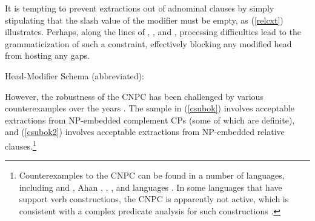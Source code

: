 \documentclass[output=paper
 	        ,biblatex
                ,babelshorthands
                ,newtxmath
                ,draftmode
                ,colorlinks, citecolor=brown
]{langscibook}
\begin{document}
\eal \label{cpnpb}
\zl

\eal  \label{cpnpb2}
\zl 

\noindent
It is tempting to prevent extractions out of adnominal clauses by simply stipulating that the {\sc
  slash} value of the modifier must be empty, as (\ref{relcxt}) illustrates.  Perhaps, along the
lines of \citet{fodor78,Fodor83}, \citet{berwickwein}, and \citet{hawkins,hawbook}, processing
difficulties lead to the grammaticization of such a constraint, effectively blocking any modified
head from hosting any gaps.

\vbox{
\ea \label{relcxt}
Head-Modifier Schema (abbreviated):\\
\z 
}

However, the robustness of the CNPC has been challenged by various counterexamples over the years
\parencites[139]{Ross67}[--207]{pollardsag}{kluender}[]{postal98}{saghof}.
The sample in (\ref{csubok}) involves acceptable extractions from NP-embedded complement CPs (some of which are definite), and
(\ref{csubok2}) involves acceptable extractions from NP-embedded relative
clauses.\footnote{Counterexamples to the CNPC can be found in a number of languages, including
   and  \citep{kunojap,Nishigauchi99}, Ahan \citep{saah}, 
  \citep[Chapter 2]{shir},  \citep{allwood,engdahl82}, 
  \citep{taraldsen82} and  languages \citep{Cinque10}.  In some languages that have
  support verb constructions, the CNPC is apparently not active, which is consistent with a complex
  predicate analysis for such constructions \citep{vives}.}
\end{document}

